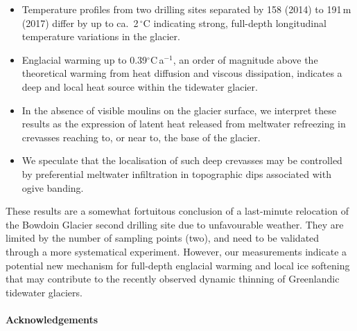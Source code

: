\documentclass[utf8]{article}
\begin{document}
    \begin{itemize}

      \item Temperature profiles from two drilling sites separated by 158
        (2014) to 191\,m (2017) differ by up to ca.~2\,$^\circ$C indicating
        strong, full-depth longitudinal temperature variations in the glacier.

      \item Englacial warming up to 0.39$^\circ$C\,a$^{-1}$, an order of
        magnitude above the theoretical warming from heat diffusion and viscous
        dissipation, indicates a deep and local heat source within the
        tidewater glacier.

      \item In the absence of visible moulins on the glacier surface, we interpret
        these results as the expression of latent heat released from meltwater
        refreezing in crevasses reaching to, or near to, the base of the glacier.

      \item We speculate that the localisation of such deep crevasses may be
        controlled by preferential meltwater infiltration in topographic dips
        associated with ogive banding.

    \end{itemize}

    These results are a somewhat fortuitous conclusion of a last-minute relocation
    of the Bowdoin Glacier second drilling site due to unfavourable weather.
    They are limited by the number of sampling points (two), and need to
    be validated through a more systematical experiment. However, our
    measurements indicate
    a potential new mechanism for full-depth englacial warming and local
    ice softening that may contribute to the recently observed dynamic
    thinning of Greenlandic tidewater glaciers.



\paragraph{Acknowledgements}
\end{document}
